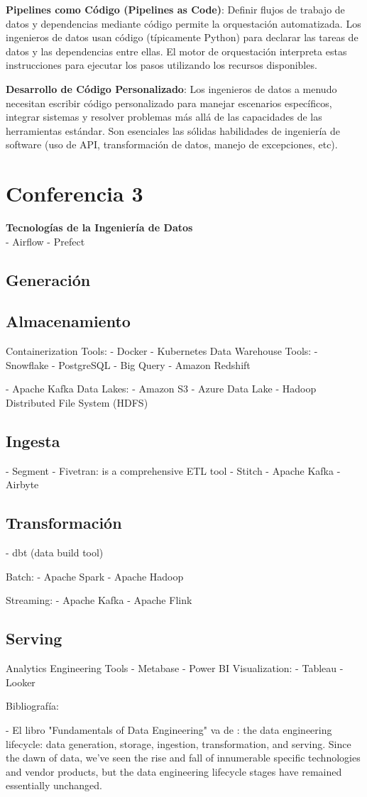 \documentclass[12pt]{book}
\begin{document}
\textbf{Pipelines como Código (Pipelines as Code)}: Definir flujos de trabajo de datos y dependencias mediante código permite la orquestación automatizada. Los ingenieros de datos usan código (típicamente Python) para declarar las tareas de datos y las dependencias entre ellas. El motor de orquestación interpreta estas instrucciones para ejecutar los pasos utilizando los recursos disponibles.

\textbf{Desarrollo de Código Personalizado}: Los ingenieros de datos a menudo necesitan escribir código personalizado para manejar escenarios específicos, integrar sistemas y resolver problemas más allá de las capacidades de las herramientas estándar. Son esenciales las sólidas habilidades de ingeniería de software (uso de API, transformación de datos, manejo de excepciones, etc).

\chapter{Conferencia 3}
\normalfont\LARGE \textbf{Tecnologías de la Ingeniería de Datos}
\normalfont\small\\

- Airflow
- Prefect

\section{Generación}
\section{Almacenamiento}
Containerization Tools:
- Docker
- Kubernetes
Data Warehouse Tools:
- Snowflake
- PostgreSQL
- Big Query
- Amazon Redshift

- Apache Kafka
Data Lakes:
- Amazon S3
- Azure Data Lake
- Hadoop Distributed File System (HDFS)

\section{Ingesta}
- Segment
- Fivetran: is a comprehensive ETL tool
- Stitch
- Apache Kafka
- Airbyte 
\section{Transformación}

- dbt (data build tool)

Batch:
- Apache Spark
- Apache Hadoop

Streaming:
- Apache Kafka
- Apache Flink

\section{Serving}
Analytics Engineering Tools
- Metabase
- Power BI
Visualization:
- Tableau
- Looker


Bibliografía: 

- El libro "Fundamentals of Data Engineering" va de : the data engineering lifecycle: data generation, storage, ingestion, transformation, and serving. Since the dawn of data, we've seen the rise and fall of innumerable specific technologies and vendor products, but the data engineering lifecycle stages have remained essentially unchanged. 
\end{document}
